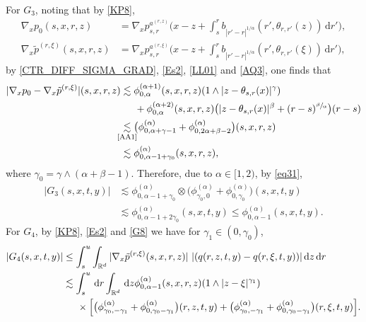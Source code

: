 \documentclass[11pt]{article}
\numberwithin{equation}{section}\providecommand{\asymp}{\mathrel{\sim}}
\newcommand{\sm}[1]{\makebox[0pt][c]{\scriptsize#1}}
\theoremstyle{plain}
\theoremstyle{definition}
\newcommand\mR{\mathbb{R}}
\newcommand\1{{\mathbf{1}}}
\newcommand{\dif}{\,\mathrm{d}}
\begin{document}
For $G_3$, noting that by \eqref{KP8},
\begin{align*}
\nabla_x {p}_0(s,x,r,z)&=\nabla_x {p}^{a^{(r,z)}}_{s,r}\biggl(x-z+\int^r_s b_{|r'-r|^{1/\alpha}}(r',\theta_{r,r'}(z))\dif r'\biggr),\\
\nabla_x \tilde{p}^{({r},\xi)}(s,x,r,z)&=\nabla_x {p}^{a^{(r,\xi)}}_{s,r}\biggl(x-z+\int^r_s b_{|r'-r|^{1/\alpha}}(r',\theta_{r,r'}(\xi))\dif r'\biggr),
\end{align*}
by \eqref{CTR_DIFF_SIGMA_GRAD}, \eqref{Es2}, \eqref{LL01} and \eqref{AQ3}, one finds that
\begin{align*}%
|\nabla_x {p}_0-\nabla_x \tilde{p}^{(r,\xi)}|(s,x,r,z)
&\lesssim\phi_{0,\alpha}^{(\alpha+1)}(s,x,r,z) (1\wedge |z-\theta_{s,r}(x)|^\gamma)\\
&\hspace*{.5cm}+\phi_{0,\alpha}^{(\alpha+2)}(s,x,r,z)\bigl(|z-\theta_{s,r}(x)|^\beta+(r-s)^{\sfrac{\beta}{\alpha}}\bigr)(r-s)\\
&\underset{\sm{\eqref{AA1}}}{\lesssim}\bigl(\phi_{0,\alpha+\gamma-1}^{(\alpha)}+\phi_{0,2\alpha+\beta-2}^{(\alpha)}\bigr)(s,x,r,z)\\
&\lesssim\phi_{0,\alpha-1+\gamma_0}^{(\alpha)}(s,x,r,z),
\end{align*}
where $\gamma_0=\gamma\wedge(\alpha+\beta-1)$.
Therefore, due to $\alpha\in[1,2)$, by \eqref{eq31},
\begin{equation}
\begin{aligned}\label{CTR_SECOND_SUMMAND}
|G_3(s,x,t,y)|&\lesssim
\phi_{0,\alpha-1+\gamma_0}^{(\alpha)}\otimes
\bigl(\phi_{\gamma_0,0}^{(\alpha)} +\phi_{0,\gamma_0}^{(\alpha)}\bigr)(s,x,t,y)\\
&\lesssim\phi_{0,\alpha-1+2\gamma_0}^{(\alpha)}(s,x,t,y)
\leq\phi_{0,\alpha-1}^{(\alpha)}(s,x,t,y).
\end{aligned}
\end{equation}
For $G_4$, by \eqref{KP8}, \eqref{Es2}
and \eqref{G8} we have for $\gamma_1\in(0,\gamma_0)$,
\begin{align*}
|G_4(s,x,t,y)|
&\le \int_s^u\int_{\mR^d}|\nabla_x\tilde{p}^{(r,\xi)}(s,x,r,z)|\ |(q(r,z,t,y)-q(r,\xi,t,y))|\dif z \dif r\\
&\lesssim \int_s^u\dif r\int_{\mR^d} \dif z \phi_{0,\alpha-1}^{(\alpha)}(s,x,r,z)(1\wedge |z-\xi|^{\gamma_1})\\
&\hspace*{.5cm}\times\Big[\bigl(\phi^{(\alpha)}_{\gamma_0,-\gamma_1}+\phi^{(\alpha)}_{0,\gamma_0-\gamma_1}\bigr)(r,z,t,y)
+\bigl(\phi^{(\alpha)}_{\gamma_0,-\gamma_1}+\phi^{(\alpha)}_{0,\gamma_0-\gamma_1}\bigr)(r,\xi,t,y)\Big].
\end{align*}
\end{document}
